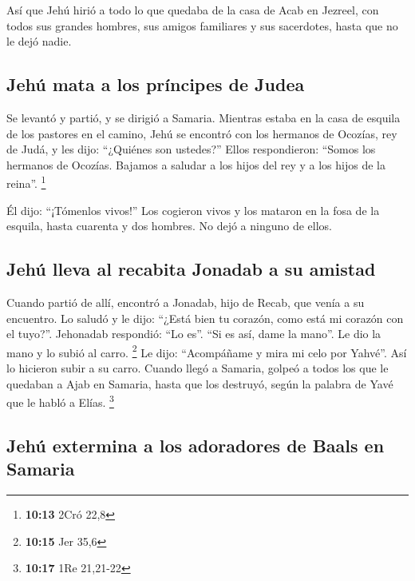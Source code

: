  Así que Jehú hirió a todo lo que quedaba de la casa de
Acab en Jezreel, con todos sus grandes hombres, sus amigos familiares y
sus sacerdotes, hasta que no le dejó nadie.

\hypertarget{jehuxfa-mata-a-los-pruxedncipes-de-judea}{%
\subsection{Jehú mata a los príncipes de
Judea}\label{jehuxfa-mata-a-los-pruxedncipes-de-judea}}

 Se levantó y partió, y se dirigió a Samaria. Mientras
estaba en la casa de esquila de los pastores en el camino,
 Jehú se encontró con los hermanos de Ocozías, rey de
Judá, y les dijo: ``¿Quiénes son ustedes?'' Ellos respondieron: ``Somos
los hermanos de Ocozías. Bajamos a saludar a los hijos del rey y a los
hijos de la reina''. \footnote{\textbf{10:13} 2Cró 22,8}

 Él dijo: ``¡Tómenlos vivos!'' Los cogieron vivos y los
mataron en la fosa de la esquila, hasta cuarenta y dos hombres. No dejó
a ninguno de ellos.

\hypertarget{jehuxfa-lleva-al-recabita-jonadab-a-su-amistad}{%
\subsection{Jehú lleva al recabita Jonadab a su
amistad}\label{jehuxfa-lleva-al-recabita-jonadab-a-su-amistad}}

 Cuando partió de allí, encontró a Jonadab, hijo de
Recab, que venía a su encuentro. Lo saludó y le dijo: ``¿Está bien tu
corazón, como está mi corazón con el tuyo?''. Jehonadab respondió: ``Lo
es''. ``Si es así, dame la mano''. Le dio la mano y lo subió al carro.
\footnote{\textbf{10:15} Jer 35,6}  Le dijo: ``Acompáñame
y mira mi celo por Yahvé''. Así lo hicieron subir a su carro.
 Cuando llegó a Samaria, golpeó a todos los que le
quedaban a Ajab en Samaria, hasta que los destruyó, según la palabra de
Yavé que le habló a Elías. \footnote{\textbf{10:17} 1Re 21,21-22}

\hypertarget{jehuxfa-extermina-a-los-adoradores-de-baals-en-samaria}{%
\subsection{Jehú extermina a los adoradores de Baals en
Samaria}\label{jehuxfa-extermina-a-los-adoradores-de-baals-en-samaria}}

